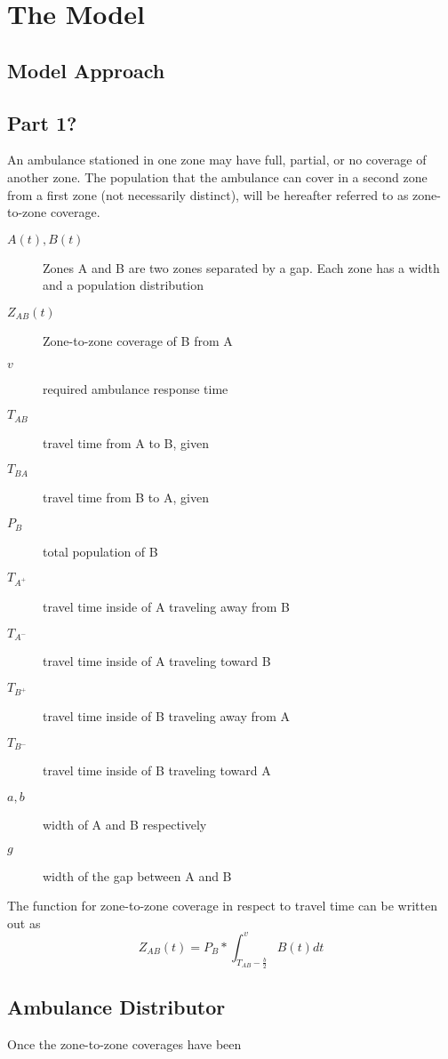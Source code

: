 \documentclass[notitlepage, 12pt]{article}
\begin{document}
\section{The Model}

\subsection{Model Approach}

\subsection{Part 1?}
An ambulance stationed in one zone may have full, partial, or no coverage of another zone. The population
that the ambulance can cover in a second zone from a first zone (not necessarily distinct), will be hereafter referred to as
zone-to-zone coverage.
\begin{description}
    \item[$A(t), B(t)$] Zones A and B are two zones separated by a gap. Each zone has a width and a population distribution
    \item[$Z_{AB}(t)$] Zone-to-zone coverage of  B from  A
    \item[$v$] required ambulance response time
    \item[$T_{AB}$] travel time from A to B, given
    \item[$T_{BA}$] travel time from B to A, given
    \item[$P_B$] total population of B
    \item[$T_{A^+}$] travel time inside of A traveling away from B
    \item[$T_{A^-}$] travel time inside of A traveling toward B
    \item[$T_{B^+}$] travel time inside of B traveling away from A
    \item[$T_{B^-}$] travel time inside of B traveling toward A
    \item[$a, b$] width of A and B respectively
    \item[$g$] width of the gap between A and B
\end{description}

The function for zone-to-zone coverage in respect to travel time can be written out as 
$$Z_{AB}(t) = P_B * \int^v_{T_{AB} - \frac{b}{2}} B(t) dt$$


\subsection{Ambulance Distributor}
Once the zone-to-zone coverages have been
\end{document}
